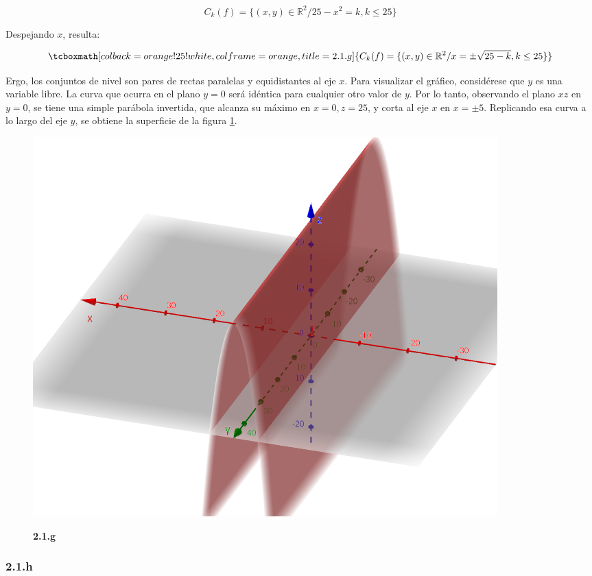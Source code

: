 \documentclass{article}
\renewcommand{\Bbb}{\mathbb}
\begin{document}
\begin{equation}
C_k(f) = \{ (x,y) \in \Bbb R^2 / 25-x^2 = k, k \leq 25 \}
\end{equation}

Despejando $x$, resulta: 

\begin{equation}
\tcboxmath[colback=orange!25!white,colframe=orange,title=2.1.g]
{ C_k(f) = \{ (x,y) \in \Bbb R^2 / x = \pm \sqrt{25-k}, k \leq 25 \} }
\end{equation}

Ergo, los conjuntos de nivel son pares de rectas paralelas y equidistantes al eje $x$. Para visualizar el gráfico, considérese que $y$ es una variable libre. La curva que ocurra en el plano $y = 0$ será idéntica para cualquier otro valor de $y$. Por lo tanto, observando el plano $xz$ en $y=0$, se tiene una simple parábola invertida, que alcanza su máximo en $x=0, z=25$, y corta al eje $x$ en $x=\pm5$. Replicando esa curva a lo largo del eje $y$, se obtiene la superficie de la figura \ref{fig:2-1-g}.

\begin{figure}[ht]
\caption{\textbf{2.1.g}}
\includegraphics[scale=0.4]{img/ejercicios/2/1-g.png} 
\centering
\label{fig:2-1-g}
\end{figure}

\subsubsection*{2.1.h}
\label{subsubsec:2.1.h}
\end{document}
